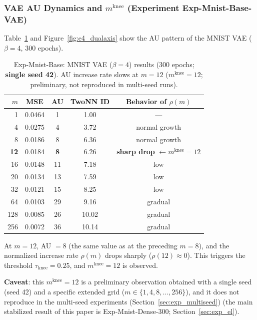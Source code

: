 \documentclass[make,article,submit,pdftex,moreauthors]{Definitions/mdpi}
\newcommand{\mknee}{m^{\mathrm{knee}}}
\begin{document}
\subsubsection{VAE AU Dynamics and $\mknee$ (Experiment Exp-Mnist-Base-VAE)}

Table~\ref{tab:e4_vae} and Figure~\ref{fig:e4_dualaxis} show the AU pattern of the MNIST VAE
($\beta = 4$, 300 epochs).

\begin{table}[H]
\centering
\caption{Exp-Mnist-Base: MNIST VAE ($\beta=4$) results (300 epochs; \textbf{single seed 42}). AU increase rate slows at $m=12$ ($\mknee=12$; preliminary, not reproduced in multi-seed runs).}
\label{tab:e4_vae}
\small
\begin{tabular}{rcccc}
\toprule
$m$ & MSE & AU & TwoNN ID & Behavior of $\rho(m)$ \\
\midrule
1   & 0.0464 & 1  & 1.00 & --- \\
4   & 0.0275 & 4  & 3.72 & normal growth \\
8   & 0.0186 & 8  & 6.36 & normal growth \\
\textbf{12} & 0.0184 & \textbf{8}  & 6.26 & \textbf{sharp drop} $\leftarrow \mknee = 12$ \\
16  & 0.0148 & 11 & 7.18 & low \\
20  & 0.0134 & 13 & 7.59 & low \\
32  & 0.0121 & 15 & 8.25 & low \\
64  & 0.0103 & 29 & 9.16 & gradual \\
128 & 0.0085 & 26 & 10.02 & gradual \\
256 & 0.0072 & 36 & 10.14 & gradual \\
\bottomrule
\end{tabular}
\end{table}

At $m = 12$, AU $= 8$ (the same value as at the preceding $m = 8$), and the normalized
increase rate $\rho(m)$ drops sharply ($\rho(12) \approx 0$).
This triggers the threshold $\tau_{\mathrm{knee}} = 0.25$, and $\mknee = 12$ is observed.

\textbf{Caveat}: this $\mknee = 12$ is a preliminary observation obtained with a single
seed (seed 42) and a specific extended grid ($m \in \{1,4,8,\ldots,256\}$), and it does
not reproduce in the multi-seed experiments (Section~\ref{sec:exp_multiseed})
(the main stabilized result of this paper is Exp-Mnist-Dense-300;
Section~\ref{sec:exp_el}).
\end{document}
